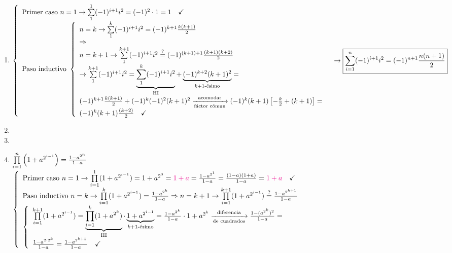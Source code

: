 \ejercicio
\hacer

\ejercicio
\begin{enumerate}[label=\roman*)]
	\item $\llave{ l }{
			      \text{Primer caso } n = 1 \to \sumatoria{1}{1} (-1)^{i+1} i^2 = (-1)^2 \cdot 1 = 1 \Tilde\\
			      \text{Paso inductivo }
			      \llave{ l }{
				      n = k \to \sumatoria{1}{k} (-1)^{i+1} i^2 = (-1)^{k+1} \frac{k(k+1)}{2} \\
				      \entonces\\
				      n = k+1 \to \sumatoria{1}{k+1}  (-1)^{i+1} i^2 \eq?= (-1)^{(k+1)+1} \frac{(k+1)(k+2)}{2}\\
				      \to \sumatoria{1}{k+1}  (-1)^{i+1} i^2 =
				      \HI{
					      \sumatoria{1}{k} (-1)^{i+1} i^2
				      } +
				      \kmasuno{
					      (-1)^{k+2} (k+1)^2
				      } =\\
				      (-1)^{k+1} \frac{k(k+1)}{2} + (-1)^k (-1)^2 (k+1)^2 \flecha{acomodar}[fáctor cómun] (-1)^k (k+1)\left[ -\frac{k}{2} + (k+1) \right] =\\
				      (-1)^k (k+1)\frac{(k+2)}{2} \Tilde
			      }
		      }\\ \to
		      \boxed{\sumatoria{i=1}{n} (-1)^{i+1} i^2 = (-1)^{n+1} \frac{n(n+1)}{2}}
	      $

	\item
	      \hacer

	\item
	      \hacer

	\item
	      $\prod\limits_{i=1}^{n} \left(  1 + a^{2^{i-1}}  \right) = \frac{1-a^{2^n}}{1-a}$\\
	      $\llave{l}{
		      \text{Primer caso } n = 1 \to
		      \productoria{i=1}{1} ( 1 + a^{2^{i-1}} ) =
		      1 + a^{2^0} = \magenta{1 + a} =
		      \frac{1-a^{2^1}}{1 - a} = \frac{(1-a)(1+a)}{1-a} =
		      \magenta{1 + a} \Tilde \\
		      \text{Paso inductivo } n = k \to
		      \productoria{i=1}{k} ( 1 + a^{2^{i-1}} ) =
		      \frac{1-a^{2^k}}{1-a} \entonces
		      n = k+1 \to  \productoria{i=1}{k+1} ( 1 + a^{2^{i-1}} ) \eq?=
		      \frac{1 - a^{2^{k+1}}}{1-a}\\
		      \llave{l}{
		      \productoria{i=1}{k+1} ( 1 + a^{2^{i-1}} ) =
		      \HI{
			      \productoria{i=1}{k} ( 1 + a^{2^k} )
		      } \cdot
		      \kmasuno{
			      1 + a^{2^{i-1}}
		      }  =
		      \frac{1-a^{2^k}}{1-a} \cdot 1 + a^{2^k}
		      \flecha{diferencia}[de cuadrados]
		      \frac{1 - ( a^{2^k})^2}{1-a} =\\
		      \frac{1 - a^{2 \cdot 2^k}}{1-a} = \frac{1 - a^{2^{k+1}}}{1-a}\Tilde
		      }
		      }
	      $




\end{enumerate}
